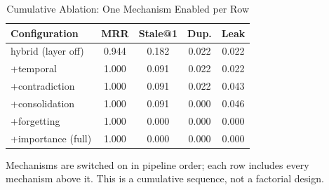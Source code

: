 \begin{table}[t]
\caption{Cumulative Ablation: One Mechanism Enabled per Row}
\label{tab:cumulative}
\centering
\footnotesize
\setlength{\tabcolsep}{4pt}
\begin{tabular}{@{}lcccc@{}}
\toprule
\textbf{Configuration} & \textbf{MRR} & \textbf{Stale@1} & \textbf{Dup.} & \textbf{Leak} \\
\midrule
hybrid (layer off) & 0.944 & 0.182 & 0.022 & 0.022 \\
+temporal & 1.000 & 0.091 & 0.022 & 0.022 \\
+contradiction & 1.000 & 0.091 & 0.022 & 0.043 \\
+consolidation & 1.000 & 0.091 & 0.000 & 0.046 \\
+forgetting & 1.000 & 0.000 & 0.000 & 0.000 \\
+importance (full) & 1.000 & 0.000 & 0.000 & 0.000 \\
\bottomrule
\end{tabular}
\par\vspace{2pt}
\raggedright\scriptsize Mechanisms are switched on in pipeline order; each row includes every mechanism above it. This is a cumulative sequence, not a factorial design.
\end{table}
